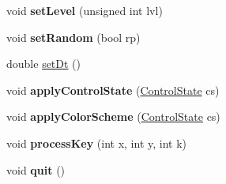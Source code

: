 \begin{DoxyCompactItemize}
\item 
\hypertarget{class_tetris_1_1_t_app_a0b3f834907a9653b39fb90370427ffb0}{void {\bfseries set\-Level} (unsigned int lvl)}\label{class_tetris_1_1_t_app_a0b3f834907a9653b39fb90370427ffb0}

\item 
\hypertarget{class_tetris_1_1_t_app_a1cdc89e6c4a1eb70e4dfa57c29b74de3}{void {\bfseries set\-Random} (bool rp)}\label{class_tetris_1_1_t_app_a1cdc89e6c4a1eb70e4dfa57c29b74de3}

\item 
double \hyperlink{class_tetris_1_1_t_app_ad605444e3c0e493fbe2adf1931716cb2}{set\-Dt} ()
\item 
\hypertarget{class_tetris_1_1_t_app_adf8df4d6f560817b5011622e44f4df1c}{void {\bfseries apply\-Control\-State} (\hyperlink{class_tetris_1_1_control_state}{Control\-State} cs)}\label{class_tetris_1_1_t_app_adf8df4d6f560817b5011622e44f4df1c}

\item 
\hypertarget{class_tetris_1_1_t_app_a732575e3dc270b6028f437dbab2e0ab3}{void {\bfseries apply\-Color\-Scheme} (\hyperlink{class_tetris_1_1_control_state}{Control\-State} cs)}\label{class_tetris_1_1_t_app_a732575e3dc270b6028f437dbab2e0ab3}

\item 
\hypertarget{class_tetris_1_1_t_app_a3bacf19e58de8451f045bdf597c61661}{void {\bfseries process\-Key} (int x, int y, int k)}\label{class_tetris_1_1_t_app_a3bacf19e58de8451f045bdf597c61661}

\item 
\hypertarget{class_tetris_1_1_t_app_adf398044bf804163181d7cd1c6c6d482}{void {\bfseries quit} ()}\label{class_tetris_1_1_t_app_adf398044bf804163181d7cd1c6c6d482}

\end{DoxyCompactItemize}
